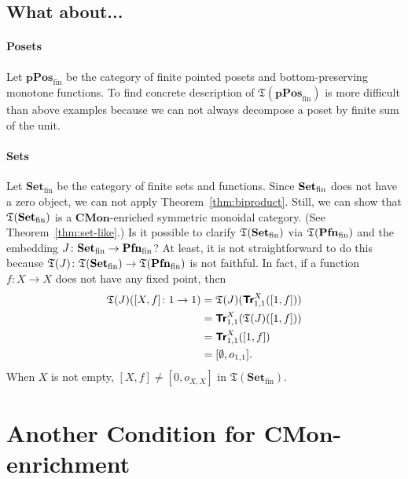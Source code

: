 \subsection{What about...}

\paragraph{Posets}

Let $\mathbf{pPos}_{\mathrm{fin}}$ be the category of finite
pointed posets and bottom-preserving monotone functions.
To find concrete description of $\mathfrak{T}(\mathbf{pPos}_{\mathrm{fin}})$ is more
difficult than above examples because we can not always
decompose a poset by finite sum of the unit.

\paragraph{Sets}

Let $\mathbf{Set}_{\mathrm{fin}}$ be the category of finite sets and
functions. Since $\mathbf{Set}_{\mathrm{fin}}$ does not have a zero object, we can not
apply Theorem~\ref{thm:biproduct}. Still, we can show that
$\mathfrak{T}(\mathbf{Set}_{\mathrm{fin}})$ is a $\mathbf{CMon}$-enriched symmetric
monoidal category. (See Theorem~\ref{thm:set-like}.) Is it possible to
clarify $\mathfrak{T}(\mathbf{Set}_{\mathrm{fin}})$ via $\mathfrak{T}(\mathbf{Pfn}_{\mathrm{fin}})$ and the
embedding $J \colon \mathbf{Set}_{\mathrm{fin}} \to \mathbf{Pfn}_{\mathrm{fin}}$? At
least, it is not straightforward to do this because
$\mathfrak{T}(J) \colon \mathfrak{T}(\mathbf{Set}_{\mathrm{fin}}) \to
\mathfrak{T}(\mathbf{Pfn}_{\mathrm{fin}})$ is not faithful. In fact, if a function
$f \colon X \to X$ does not have any fixed point, then
\begin{align*}
  \mathfrak{T}(J)([X,f] \colon 1 \to 1)
  &= \mathfrak{T}(J)({\normalfont\textsf{\textbf{Tr}}}^{X}_{1,1} ([1,f])) \\
  &= {\normalfont\textsf{\textbf{Tr}}}^{X}_{1,1} (\mathfrak{T}(J)([1,f])) \\
  &= {\normalfont\textsf{\textbf{Tr}}}^{X}_{1,1} ([1,f]) \\
  &= [\emptyset,o_{1,1}].
\end{align*}
When $X$ is not empty, $[X,f] \neq [0,o_{X,X}]$ in $\mathfrak{T}(\mathbf{Set}_{\mathrm{fin}})$.


\section{Another Condition for $\mathbf{CMon}$-enrichment}


